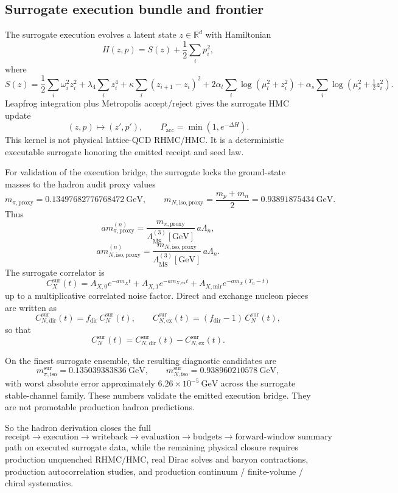 \documentclass[11pt]{article}
\begin{document}
\subsection{Surrogate execution bundle and frontier}

The surrogate execution evolves a latent state \(z\in\mathbb{R}^d\) with Hamiltonian
\[
H(z,p) = S(z) + \frac12 \sum_i p_i^2,
\]
where
\[
S(z)
=
\frac12 \sum_i \omega_i^2 z_i^2
+
\lambda_4 \sum_i z_i^4
+
\kappa \sum_i (z_{i+1}-z_i)^2
+
2\alpha_l \sum_i \log(\mu_l^2 + z_i^2)
+
\alpha_s \sum_i \log(\mu_s^2 + \tfrac12 z_i^2).
\]
Leapfrog integration plus Metropolis accept/reject gives the surrogate HMC update
\[
(z,p) \mapsto (z',p'),
\qquad
P_{\mathrm{acc}} = \min(1,e^{-\Delta H}).
\]
This kernel is not physical lattice-QCD RHMC/HMC. It is a deterministic executable surrogate
honoring the emitted receipt and seed law.

For validation of the execution bridge, the surrogate locks the ground-state masses to the hadron
audit proxy values
\[
m_{\pi,\mathrm{proxy}} = 0.13497682776768472\ \mathrm{GeV},
\qquad
m_{N,\mathrm{iso,proxy}}
=
\frac{m_p+m_n}{2}
=
0.93891875434\ \mathrm{GeV}.
\]
Thus
\[
a m_{\pi,\mathrm{proxy}}^{(n)}
=
\frac{m_{\pi,\mathrm{proxy}}}{\Lambda_{\overline{\mathrm{MS}}}^{(3)}[\mathrm{GeV}]}
\,a\Lambda_n,
\]
\[
a m_{N,\mathrm{iso,proxy}}^{(n)}
=
\frac{m_{N,\mathrm{iso,proxy}}}{\Lambda_{\overline{\mathrm{MS}}}^{(3)}[\mathrm{GeV}]}
\,a\Lambda_n.
\]
The surrogate correlator is
\[
C_X^{\mathrm{sur}}(t)
=
A_{X,0} e^{-a m_X t}
+
A_{X,1} e^{-a m_{X,\mathrm{ex}} t}
+
A_{X,\mathrm{mir}} e^{-a m_X (T_n-t)}
\]
up to a multiplicative correlated noise factor. Direct and exchange nucleon pieces are written as
\[
C_{N,\mathrm{dir}}^{\mathrm{sur}}(t)
=
f_{\mathrm{dir}}\,C_N^{\mathrm{sur}}(t),
\qquad
C_{N,\mathrm{ex}}^{\mathrm{sur}}(t)
=
(f_{\mathrm{dir}}-1)\,C_N^{\mathrm{sur}}(t),
\]
so that
\[
C_N^{\mathrm{sur}}(t)
=
C_{N,\mathrm{dir}}^{\mathrm{sur}}(t)
-
C_{N,\mathrm{ex}}^{\mathrm{sur}}(t).
\]

On the finest surrogate ensemble, the resulting diagnostic candidates are
\[
m_{\pi,\mathrm{iso}}^{\mathrm{sur}} = 0.135039383836\ \mathrm{GeV},
\qquad
m_{N,\mathrm{iso}}^{\mathrm{sur}} = 0.938960210578\ \mathrm{GeV},
\]
with worst absolute error approximately \(6.26\times10^{-5}\ \mathrm{GeV}\) across the surrogate
stable-channel family. These numbers validate the emitted execution bridge. They are not
promotable production hadron predictions.

So the hadron derivation closes the full
\[
\text{receipt} \to \text{execution} \to \text{writeback} \to \text{evaluation} \to \text{budgets} \to \text{forward-window summary}
\]
path on executed surrogate data, while the remaining physical closure requires production
unquenched RHMC/HMC, real Dirac solves and baryon contractions, production autocorrelation
studies, and production continuum / finite-volume / chiral systematics.
\end{document}
